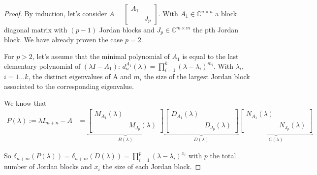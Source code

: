 \documentclass[11pt]{article}
\begin{document}
\begin{proof}
By induction, let's consider $A=\begin{bmatrix}
A_1 & \\
 & J_p
\end{bmatrix}$. With $A_1 \in \mathbb{C}^{n\times n}$ a block diagonal matrix with $(p-1)$ Jordan blocks and $J_p\in \mathbb{C}^{m\times m}$ the pth Jordan block. 
We have already proven the case $p = 2$.

For $p > 2$, let's assume that the minimal polynomial of $A_1$ is equal to the last elementary polynomial of $(\lambda I - A_1)$: $d_{n}^{A_1}(\lambda) = \prod_{i = 1}^k (\lambda - \lambda_i)^{m_i}$. With $\lambda_i$, $i= 1 \dots k$, the distinct eigenvalues of A and $m_i$ the size of the largest Jordan block associated to the corresponding eigenvalue.

We know that
\begin{align*}
 P(\lambda):=\lambda I_{m+n} - A 
&= \underbrace{\begin{bmatrix}
 M_{A_1}(\lambda) & \\
  & M_{J_p}(\lambda)
 \end{bmatrix}}_{B(\lambda)}\underbrace{\begin{bmatrix}
 D_{A_1}(\lambda) & \\
  & D_{J_p}(\lambda)
 \end{bmatrix}}_{D(\lambda)}\underbrace{\begin{bmatrix}
 N_{A_1}(\lambda) & \\
  & N_{J_p}(\lambda)
 \end{bmatrix}}_{C(\lambda)}
 \end{align*}
 
 So $\delta_{n+m}(P(\lambda)) = \delta_{n+m}(D(\lambda)) = \prod_{i = 1}^p (\lambda - \lambda_i)^{x_i}$ with $p$ the total number of Jordan blocks and $x_i$ the size of each Jordan block.
 

\end{proof}
\end{document}
